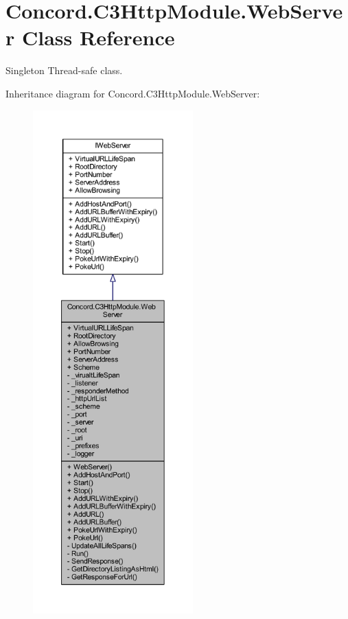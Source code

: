 \hypertarget{class_concord_1_1_c3_http_module_1_1_web_server}{}\section{Concord.\+C3\+Http\+Module.\+Web\+Server Class Reference}
\label{class_concord_1_1_c3_http_module_1_1_web_server}


Singleton Thread-\/safe class.  




Inheritance diagram for Concord.\+C3\+Http\+Module.\+Web\+Server\+:
\nopagebreak
\begin{figure}[H]
\begin{center}
\leavevmode
\includegraphics[height=550pt]{class_concord_1_1_c3_http_module_1_1_web_server__inherit__graph}
\end{center}
\end{figure}



